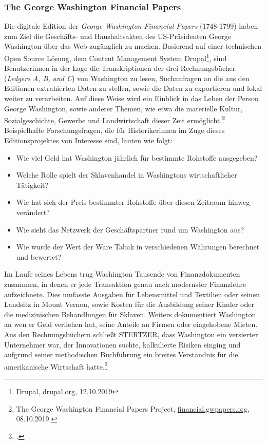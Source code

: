 \documentclass[12pt,a4paper]{article}
\begin{document}
\subsubsection{The George Washington Financial Papers}

Die digitale Edition der \textit{George Washington Financial Papers} (1748-1799) haben zum Ziel die Geschäfts- und Haushaltsakten des US-Präsidenten George Washington über das Web zugänglich zu machen. Basierend auf einer technischen Open Source Lösung, dem Content Management System Drupal\footnote{Drupal, \protect\url{drupal.org}, 12.10.2019}, sind Benutzerinnen in der Lage die Transkriptionen der drei Rechnungsbücher (\textit{Ledgers A, B, and C}) von Washington zu lesen, Suchanfragen an die aus den Editionen extrahierten Daten zu stellen, sowie die Daten zu exportieren und lokal weiter zu verarbeiten. Auf diese Weise wird ein Einblick in das Leben der Person George Washington, sowie  anderer Themen, wie etwa die materielle Kultur, Sozialgeschichte, Gewerbe und Landwirtschaft dieser Zeit ermöglicht.\footnote{The George Washington Financial Papers Project, \protect\url{financial.gwpapers.org}, 08.10.2019.} Beispielhafte Forschungsfragen, die für Historikerinnen im Zuge dieses Editionsprojektes von Interesse sind, lauten wie folgt: 
\begin{itemize}
\item Wie viel Geld hat Washington jährlich für bestimmte Rohstoffe ausgegeben?
\item Welche Rolle spielt der Sklavenhandel in Washingtons wirtschaftlicher Tätigkeit?
\item Wie hat sich der Preis bestimmter Rohstoffe über diesen Zeitraum hinweg verändert?
\item Wie sieht das Netzwerk der Geschäftspartner rund um Washington aus?
\item Wie wurde der Wert der Ware Tabak in verschiedenen Währungen berechnet und bewertet?
\end{itemize}
Im Laufe seines Lebens trug Washington Tausende von Finanzdokumenten zusammen, in denen er jede Transaktion genau nach modernster Finanzlehre aufzeichnete. Dies umfasste Ausgaben für Lebensmittel und Textilien oder seinen Landsitz in Mount Vernon, sowie Kosten für die Ausbildung seiner Kinder oder die medizinischen Behandlungen für Sklaven. Weiters dokumentiert Washington an wen er Geld verliehen hat, seine Anteile an Firmen oder eingehobene Mieten.
Aus den Rechnungsbüchern schließt STERTZER, dass Washington ein versierter Unternehmer war, der Innovationen suchte, kalkulierte Risiken einging und aufgrund seiner methodischen Buchführung ein breites Verständnis für die amerikanische Wirtschaft hatte.\footcite[][]{stertzer2014working}
\end{document}
